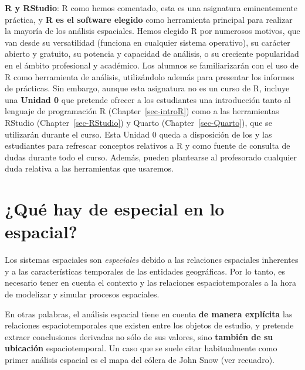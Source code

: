 \documentclass[
  letterpaper,
  DIV=11,
  numbers=noendperiod]{scrreprt}
\begin{document}
\begin{itemize}
  \textbf{R y RStudio}: R como hemos comentado, esta es una asignatura
  eminentemente práctica, y \textbf{R es el software elegido} como
  herramienta principal para realizar la mayoría de los análisis
  espaciales. Hemos elegido R por numerosos motivos, que van desde su
  versatilidad (funciona en cualquier sistema operativo), su carácter
  abierto y gratuito, su potencia y capacidad de análisis, o su
  creciente popularidad en el ámbito profesional y académico. Los
  alumnos se familiarizarán con el uso de R como herramienta de
  análisis, utilizándolo además para presentar los informes de
  prácticas. Sin embargo, aunque esta asignatura no es un curso de R,
  incluye una \textbf{Unidad 0} que pretende ofrecer a los estudiantes
  una introducción tanto al lenguaje de programación R
  (Chapter~\ref{sec-introR}) como a las herramientas RStudio
  (Chapter~\ref{sec-RStudio}) y Quarto (Chapter~\ref{sec-Quarto}), que
  se utilizarán durante el curso. Esta Unidad 0 queda a disposición de
  los y las estudiantes para refrescar conceptos relativos a R y como
  fuente de consulta de dudas durante todo el curso. Además, pueden
  plantearse al profesorado cualquier duda relativa a las herramientas
  que usaremos.
\end{itemize}

\hypertarget{quuxe9-hay-de-especial-en-lo-espacial}{%
\section*{¿Qué hay de especial en lo
espacial?}\label{quuxe9-hay-de-especial-en-lo-espacial}}


Los sistemas espaciales son \emph{especiales} debido a las relaciones
espaciales inherentes y a las características temporales de las
entidades geográficas. Por lo tanto, es necesario tener en cuenta el
contexto y las relaciones espaciotemporales a la hora de modelizar y
simular procesos espaciales.

En otras palabras, el análisis espacial tiene en cuenta \textbf{de
manera explícita} las relaciones espaciotemporales que existen entre los
objetos de estudio, y pretende extraer conclusiones derivadas no sólo de
sus valores, sino \textbf{también de su ubicación} espaciotemporal. Un
caso que se suele citar habitualmente como primer análisis espacial es
el mapa del cólera de John Snow (ver recuadro).
\end{document}
